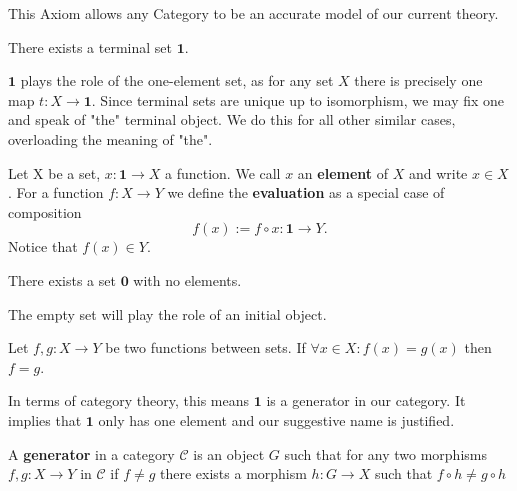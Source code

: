 \begin{remark}
This Axiom allows any Category to be an accurate model of our current theory.
\end{remark}

\begin{axiom}[Elements]
There exists a terminal set $\mathbf{1}$.
\end{axiom}

\begin{remark}
$\mathbf{1}$ plays the role of the one-element set, as for any set $X$ there is precisely one map $t: X \longrightarrow \mathbf{1}$. Since terminal sets are unique up to isomorphism, we may fix one and speak of "the" terminal object. We do this for all other similar cases, overloading the meaning of "the".
\end{remark}

\begin{definition}
Let X be a set, $x: \mathbf{1} \longrightarrow X$ a function. We call $x$ an \textbf{element} of $X$ and write $x \in X$. For a function $f:X \longrightarrow Y$ we define the \textbf{evaluation} as a special case of composition 
\begin{equation*}
f(x) := f \circ x: \mathbf{1} \longrightarrow Y.
\end{equation*}
Notice that $f(x) \in Y$.
\end{definition}

\begin{axiom}
There exists a set $\mathbf{0}$ with no elements.
\end{axiom}

\begin{remark}
The empty set will play the role of an initial object.
\end{remark}

\begin{axiom}
Let $f,g: X \longrightarrow Y$ be two functions between sets. If $\forall x \in X: f(x) = g(x)$ then $f = g$.
\end{axiom}

\begin{remark}
In terms of category theory, this means $\mathbf{1}$ is a generator in our category. It implies that $\mathbf{1}$ only has one element and our suggestive name is justified.
\end{remark}

\begin{definition}
A \textbf{generator} in a category $\mathcal{C}$ is an object $G$ such that for any two morphisms $f,g: X \longrightarrow Y$ in $\mathcal{C}$ if $f \neq g$ there exists a morphism $h: G \longrightarrow X$ such that $f \circ h \neq g \circ h$
\end{definition}

